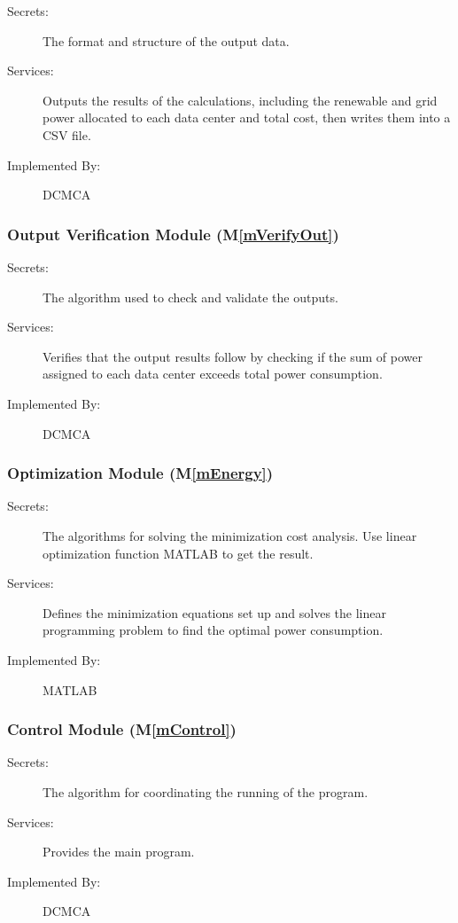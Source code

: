 \documentclass[12pt]{article}
\newcommand{\mref}[1]{M\ref{#1}}
\begin{document}
\begin{description}
\item[Secrets:] The format and structure of the output data.
\item[Services:] Outputs the results of the calculations, including the renewable and grid power allocated to each data center and total cost, then writes them into a CSV file.
\item[Implemented By:] DCMCA
\end{description} 

\subsubsection{Output Verification Module (\mref{mVerifyOut})}

\begin{description}
\item[Secrets:] The algorithm used to check and validate the outputs.
\item[Services:] Verifies that the output results follow by checking if the sum of power assigned to each data center exceeds total power consumption.
\item[Implemented By:] DCMCA
\end{description}


\subsubsection{Optimization Module (\mref{mEnergy})}

\begin{description}
\item[Secrets:] The algorithms for solving the minimization cost analysis. Use linear optimization function MATLAB to get the result.
\item[Services:] Defines the minimization equations set up and solves the linear programming problem to find the optimal power consumption.
\item[Implemented By:] MATLAB
\end{description} 

\subsubsection{Control Module (\mref{mControl})}

\begin{description}
\item[Secrets:] The algorithm for coordinating the running of the program.
\item[Services:] Provides the main program.
\item[Implemented By:] DCMCA
\end{description}
 
\end{document}
